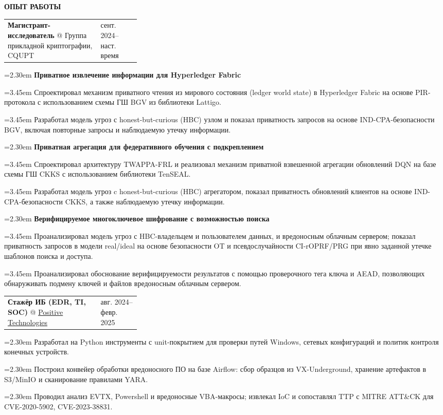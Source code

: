 \documentclass[11pt,a4paper]{article}
\makeatletter
\newcommand{\cvrow}[2]{%
  \noindent
  \begin{minipage}[t]{0.145\textwidth}
    \vspace{0pt}%
    \raggedright
    \fontsize{8.5}{10}\selectfont
    \bfseries\MakeUppercase{#1}
  \end{minipage}%
  \hfill
  \begin{minipage}[t]{0.835\textwidth}
    \vspace{0pt}%
    #2
  \end{minipage}\par
}
\newcommand{\workentry}[2]{%
  \noindent
  \begin{tabularx}{\linewidth}
    {@{}X@{\hspace{0.8em}}
    >{\raggedleft\arraybackslash}p{0.30\linewidth}@{}}
    #1 & \small #2
  \end{tabularx}\par
  \vspace{0.15em}
}
\newcommand{\workproject}[1]{%
  \noindent
  \hangindent=2.30em
  \hangafter=1
  \hspace*{1.15em}\makebox[1.15em][l]{$\diamond$}#1\par
  \vspace{0.12em}
}
\newcommand{\workprojectdetail}[1]{%
  \noindent
  \hangindent=3.45em
  \hangafter=1
  \hspace*{2.30em}\makebox[1.15em][l]{--}#1\par
  \vspace{0.08em}
}
\makeatother
\begin{document}
\cvrow{Опыт работы}{%
  \workentry
    {\textbf{Магистрант-исследователь} @ Группа прикладной криптографии, CQUPT}
    {сент. 2024--наст. время}

  \workproject{\textbf{Приватное извлечение информации для Hyperledger Fabric}}
  \workprojectdetail{Спроектировал механизм приватного чтения из мирового состояния 
  (ledger world state) в Hyperledger Fabric на основе PIR-протокола с использованием схемы ГШ 
  BGV из библиотеки Lattigo.}
  \workprojectdetail{Разработал модель угроз с honest-but-curious (HBC) узлом
  и показал приватность запросов на основе IND-CPA-безопасности
  BGV, включая повторные запросы и наблюдаемую утечку информации.}

  \workproject{\textbf{Приватная агрегация для федеративного обучения с подкреплением}}
  \workprojectdetail{Спроектировал архитектуру TWAPPA-FRL и реализовал
  механизм приватной взвешенной агрегации обновлений DQN на базе схемы
  ГШ CKKS с использованием библиотеки TenSEAL.}
  \workprojectdetail{Разработал модель угроз c honest-but-curious (HBC) агрегатором, показал
  приватность обновлений клиентов на основе IND-CPA-безопасности CKKS, а также наблюдаемую 
  утечку информации.}

  \workproject{\textbf{Верифицируемое многоключевое шифрование с возможностью поиска}}
  \workprojectdetail{Проанализировал модель угроз с HBC-владельцем и пользователем данных,
  и вредоносным облачным сервером; показал приватность запросов в модели
  real/ideal на основе безопасности OT и псевдослучайности CI-rOPRF/PRG
  при явно заданной утечке шаблонов поиска и доступа.}
  \workprojectdetail{Проанализировал обоснование верифицируемости результатов с помощью
  проверочного тега ключа и AEAD, позволяющих обнаруживать подмену ключей
  и файлов вредоносным облачным сервером.}
}

\vspace{0.50em}

\cvrow{}{%
  \workentry
    {\textbf{Стажёр ИБ (EDR, TI, SOC)} @
    \href{https://global.ptsecurity.com/en/}{Positive Technologies}}
    {авг. 2024--февр. 2025}

  \workproject{Разработал на Python инструменты с unit-покрытием для
  проверки путей Windows, сетевых конфигураций и политик контроля конечных устройств.}
  \workproject{Построил конвейер обработки вредоносного ПО на базе Airflow:
  сбор образцов из VX-Underground, хранение артефактов в S3/MinIO
  и сканирование правилами YARA.}
  \workproject{Проводил анализ EVTX, Powershell и вредоносные VBA-макросы;
  извлекал IoC и сопоставлял TTP с MITRE ATT\&CK для CVE-2020-5902, CVE-2023-38831.}
}
\end{document}
